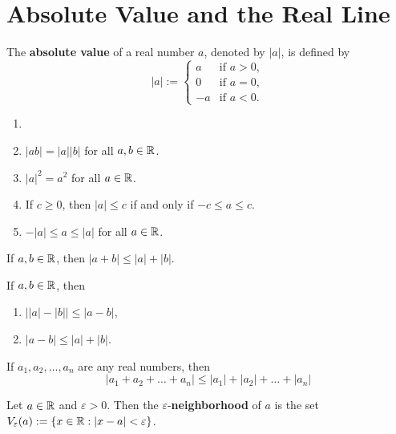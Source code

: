 \section{Absolute Value and the Real Line}

\begin{definition}
	The \textbf{absolute value} of a real number $a$, denoted by $|a|$, is defined by
	\[|a|:=\begin{cases}
			a  & \text{if } a>0, \\
			0  & \text{if } a=0, \\
			-a & \text{if } a<0.
		\end{cases}\]
\end{definition}

\begin{theorem}
	\begin{enumerate}
		\item[]
		\item $|ab|=|a||b|$ for all $a,b \in \mathbb{R}$.
		\item $|a|^2 = a^2$ for all $a \in \mathbb{R}$.
		\item If $c \geq 0$, then $|a| \leq c$ if and only if $-c \leq a \leq c$.
		\item $-|a|\leq a \leq |a|$ for all $a \in \mathbb{R}$.
	\end{enumerate}
\end{theorem}

\begin{theorem}
	If $a,b \in \mathbb{R}$, then $|a+b| \leq |a| + |b|$.
\end{theorem}

\begin{corollary}
	If $a,b \in \mathbb{R}$, then
	\begin{enumerate}
		\item $\left| |a|-|b| \right| \leq |a-b|$,
		\item $|a-b| \leq |a| + |b|$.
	\end{enumerate}
\end{corollary}

\begin{corollary}
	If $a_1, a_2, \dots, a_n$ are any real numbers, then
	\[|a_1 + a_2 + \dots + a_n| \leq |a_1| + |a_2| + \dots + |a_n|\]
\end{corollary}

\begin{definition}
	Let $a \in \mathbb{R}$ and $\varepsilon > 0$. Then the $\varepsilon$-\textbf{neighborhood} of $a$ is the set $V_\varepsilon(a):=\{x \in \mathbb{R} : |x-a| < \varepsilon\}$.
\end{definition}
